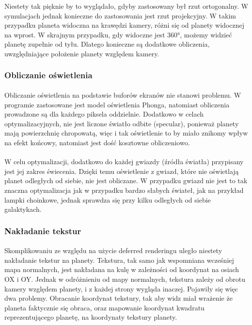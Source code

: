 Niestety tak pięknie by to wyglądało, gdyby zastosowany był rzut ortogonalny. W symulacjach jednak konieczne do zastosowania jest rzut projekcyjny. W takim przypadku planeta widoczna na krawędzi kamery, różni się od planety widocznej na wprost. W skrajnym przypadku, gdy widoczne jest 360°, możemy widzieć planetę zupełnie od tyłu. Dlatego konieczne są dodatkowe obliczenia, uwzględniające położenie planety względem kamery.

\subsubsection{Obliczanie oświetlenia}\label{ssub:obliczanie oświetlenia}
\paragraph{}

Obliczanie oświetlenia na podstawie buforów ekranów nie stanowi problemu. W programie zastosowane jest model oświetlenia Phonga, natomiast obliczenia prowadzone są dla każdego piksela oddzielnie. Dodatkowo w celach optymalizacyjnych, nie jest liczone światło odbite (specular), ponieważ planety mają powierzchnię chropowatą, więc i tak oświetlenie to by miało znikomy wpływ na efekt końcowy, natomiast jest dość kosztowne obliczeniowo.

\paragraph{}

W celu optymalizacji, dodatkowo do każdej gwiazdy (źródła światła) przypisany jest jej zakres świecenia. Dzięki temu oświetlenie z gwiazd, które nie oświetlają planet odległych od siebie, nie jest obliczane. W przypadku gwiazd nie jest to tak znaczna optymalizacja jak w przypadku bardzo słabych świateł, jak na przykład lampki choinkowe, jednak sprawdza się przy kilku odległych od siebie galaktykach.

\subsubsection{Nakładanie tekstur}\label{ssub:nakladanie tekstur}
\paragraph{}

Skomplikowaniu ze względu na użycie deferred renderingu uległo niestety nakładanie tekstur na planety. Tekstura, tak samo jak wspomniana wcześniej mapa normalnych, jest nakładana na kulę w zależności od koordynat na osiach OX i OY. Jednak w odróżnieniu od mapy normalnych, tekstura zależy od obrotu kamery względem planety, i z każdej strony wygląda inaczej. Pojawiły się więc dwa problemy. Obracanie koordynat tekstury, tak aby widz miał wrażenie że planeta faktycznie się obraca, oraz mapowanie koordynat kwadratu reprezentującego planetę, na koordynaty tekstury planety.

